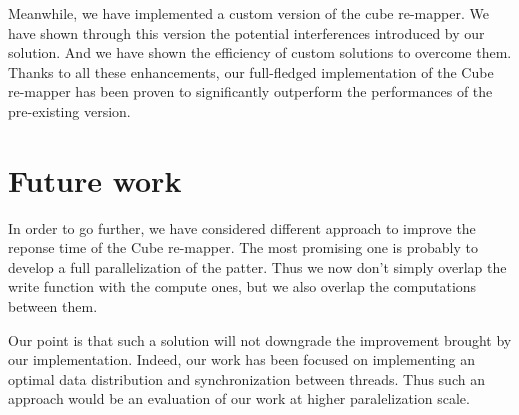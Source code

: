 \documentclass[12pt]{article}											%
\begin{document}
	Meanwhile, we have implemented a custom version of the cube re-mapper.   We have shown through this version the potential interferences introduced by our solution.   And we have shown the efficiency of custom solutions to overcome them.\\

	Thanks to all these enhancements, our full-fledged implementation of the Cube re-mapper has been proven to significantly outperform the performances of the pre-existing version.


\section{Future work}
	In order to go further, we have considered different approach to improve the reponse time of the Cube re-mapper.   The most promising one is probably to develop a full parallelization of the patter.   Thus we now don't simply overlap the write function with the compute ones, but we also overlap the computations between them.

	Our point is that such a solution will not downgrade the improvement brought by our implementation.   Indeed, our work has been focused on implementing an optimal data distribution and synchronization between threads.   Thus such an approach would be an evaluation of our work at higher paralelization scale.
	
	
\end{document}
